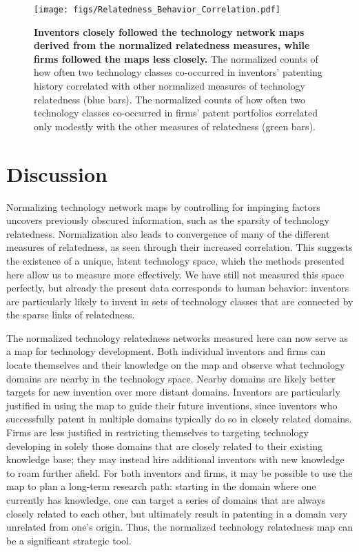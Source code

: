 \documentclass[pre,reprint,groupedaddress,superscriptaddress]{revtex4-1}
\begin{document}
\begin{figure}[]
\begin{center}
\texttt{[image: figs/Relatedness\_Behavior\_Correlation.pdf]} 
\end{center}
\caption{\textbf{Inventors closely followed the technology network maps derived from the normalized relatedness measures, while firms followed the maps less closely.} The normalized counts of how often two technology classes co-occurred in inventors' patenting history correlated with other normalized measures of technology relatedness (blue bars). The normalized counts of how often two technology classes co-occurred in firms' patent portfolios correlated only modestly with the other measures of relatedness (green bars). %
}\label{Relatedness_Behavior_Correlation}
\end{figure}

\section{Discussion} 
Normalizing technology network maps by controlling for impinging factors uncovers previously obscured information, such as the sparsity of technology relatedness. Normalization also leads to convergence of many of the different measures of relatedness, as seen through their increased correlation. This suggests the existence of a unique, latent technology space, which the methods presented here allow us to measure more effectively. We have still not measured this space perfectly, but already the present data corresponds to human behavior: inventors are particularly likely to invent in sets of technology classes that are connected by the sparse links of relatedness. 

The normalized technology relatedness networks measured here can now serve as a map for technology development. Both individual inventors and firms can locate themselves and their knowledge on the map and observe what technology domains are nearby in the technology space. Nearby domains are likely better targets for new invention over more distant domains. Inventors are particularly justified in using the map to guide their future inventions, since inventors who successfully patent in multiple domains typically do so in closely related domains. Firms are less justified in restricting themselves to targeting technology developing in solely those domains that are closely related to their existing knowledge base; they may instead hire additional inventors with new knowledge to roam further afield. For both inventors and firms, it may be possible to use the map to plan a long-term research path: starting in the domain where one currently has knowledge, one can target a series of domains that are always closely related to each other, but ultimately result in patenting in a domain very unrelated from one's origin. Thus, the normalized technology relatedness map can be a significant strategic tool. 
\end{document}
